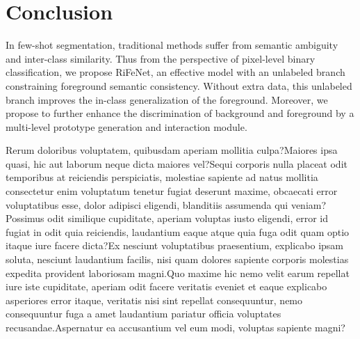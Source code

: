 \documentclass[letterpaper]{article} %
\begin{document}
\vspace{-0.96mm}
\section{Conclusion}
In few-shot segmentation, traditional methods suffer from semantic ambiguity and inter-class similarity. Thus from the perspective of pixel-level binary classification, we propose RiFeNet, an effective model with an unlabeled branch constraining foreground semantic consistency. Without extra data, this unlabeled branch improves the in-class generalization of the foreground. Moreover, we propose to further enhance the discrimination of background and foreground by a multi-level prototype generation and interaction module.

Rerum doloribus voluptatem, quibusdam aperiam mollitia culpa?Maiores ipsa quasi, hic aut laborum neque dicta maiores vel?Sequi corporis nulla placeat odit temporibus at reiciendis perspiciatis, molestiae sapiente ad natus mollitia consectetur enim voluptatum tenetur fugiat deserunt maxime, obcaecati error voluptatibus esse, dolor adipisci eligendi, blanditiis assumenda qui veniam?Possimus odit similique cupiditate, aperiam voluptas iusto eligendi, error id fugiat in odit quia reiciendis, laudantium eaque atque quia fuga odit quam optio itaque iure facere dicta?Ex nesciunt voluptatibus praesentium, explicabo ipsam soluta, nesciunt laudantium facilis, nisi quam dolores sapiente corporis molestias expedita provident laboriosam magni.Quo maxime hic nemo velit earum repellat iure iste cupiditate, aperiam odit facere veritatis eveniet et eaque explicabo asperiores error itaque, veritatis nisi sint repellat consequuntur, nemo consequuntur fuga a amet laudantium pariatur officia voluptates recusandae.Aspernatur ea accusantium vel eum modi, voluptas sapiente magni?\clearpage

\end{document}
